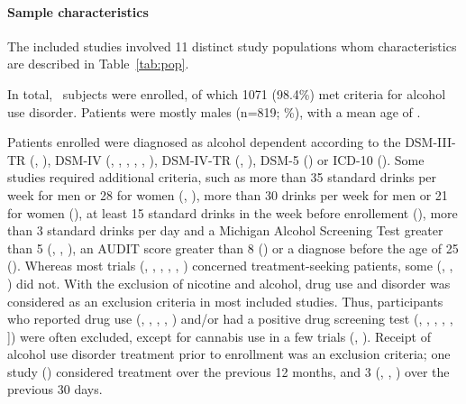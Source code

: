 \paragraph{Sample characteristics}

The included studies involved 11 distinct study populations whom characteristics are described in Table~\ref{tab:pop}.

In total, \totalrandomized\ subjects were enrolled, of which 1071 (98.4\%) met criteria for alcohol use disorder. Patients were mostly males (n=819; \pmales\%), with a mean age of \meanage.

Patients enrolled were diagnosed as alcohol dependent according to the DSM-III-TR (\cite{sellers_clinical_1994}, \cite{johnson_ondansetron_2000}), DSM-IV (\cite{myrick_effect_2008}, \cite{johnson_combining_2000}, \cite{ait-daoud_combining_2001}, \cite{kranzler_effects_2003}, \cite{dawes_prospective_2005}, \cite{johnson_pharmacogenetic_2011}), DSM-IV-TR (\cite{kenna_within-group_2009}, \cite{kenna_ondansetron_2014-1}), DSM-5 (\cite{sherwood_brown_randomized_2021}) or ICD-10 (\cite{correa_filho_pilot_2013}).
Some studies required additional criteria, such as more than 35 standard drinks per week for men or 28 for women (\cite{kenna_within-group_2009}, \cite{kenna_ondansetron_2014-1}), more than 30 drinks per week for men or 21 for women (\cite{seneviratne_serotonin_2012}), at least 15 standard drinks in the week before enrollement (\cite{sherwood_brown_randomized_2021}), more than 3 standard drinks per day and a Michigan Alcohol Screening Test greater than 5 (\cite{johnson_combining_2000}, \cite{johnson_ondansetron_2000}, \cite{ait-daoud_combining_2001}), an AUDIT score greater than 8 (\cite{johnson_pharmacogenetic_2011}) or a diagnose before the age of 25 (\cite{sherwood_brown_randomized_2021}).
Whereas most trials (\cite{sellers_clinical_1994}, \cite{johnson_combining_2000}, \cite{johnson_ondansetron_2000}, \cite{ait-daoud_combining_2001}, \cite{kranzler_effects_2003}, \cite{dawes_prospective_2005}) concerned treatment-seeking patients, some (\cite{myrick_effect_2008}, \cite{kenna_within-group_2009}, \cite{kenna_ondansetron_2014-1}) did not. With the exclusion of nicotine and alcohol, drug use and disorder was considered as an exclusion criteria in most included studies. Thus, participants who reported drug use (\cite{kranzler_effects_2003}, \cite{myrick_effect_2008}, \cite{kenna_within-group_2009}, \cite{johnson_pharmacogenetic_2011}, \cite{kenna_ondansetron_2014-1}) and/or had a positive drug screening test (\cite{sellers_clinical_1994}, \cite{johnson_combining_2000}, \cite{johnson_ondansetron_2000}, \cite{ait-daoud_combining_2001}, \cite{myrick_effect_2008}, \cite{correa_filho_pilot_2013}]) were often excluded, except for cannabis use in a few trials (\cite{dawes_prospective_2005}, \cite{myrick_effect_2008}). Receipt of alcohol use disorder treatment prior to enrollment was an exclusion criteria; one study (\cite{sellers_clinical_1994}) considered treatment over the previous 12 months, and 3 (\cite{johnson_age_2000}, \cite{ait-daoud_combining_2001}, \cite{dawes_prospective_2005}) over the previous 30 days. 

